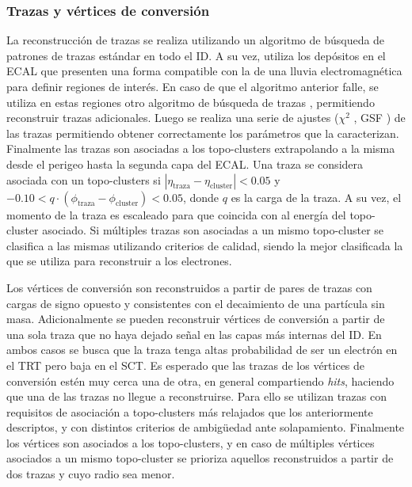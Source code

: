 
\subsubsection{Trazas y vértices de conversión}

La reconstrucción de trazas se realiza utilizando un algoritmo de búsqueda de patrones de trazas estándar
\cite{Cornelissen:1020106, PERF-2017-02, PERF-2017-01} en todo el ID. A su vez, utiliza los depósitos en el ECAL que presenten una forma compatible con la de una lluvia electromagnética para definir regiones de interés. En caso de que el algoritmo anterior falle, se utiliza en estas regiones otro algoritmo de búsqueda de trazas \cite{FRUHWIRTH1987444}, permitiendo reconstruir trazas adicionales. Luego se realiza una serie de ajustes ($\chi^2$ \cite{Cornelissen:1176901}, GSF \cite{ATLAS-CONF-2012-047}) de las trazas permitiendo obtener correctamente los parámetros que la caracterizan. Finalmente las trazas son asociadas a los topo-clusters extrapolando a la misma desde el perigeo hasta la segunda capa del ECAL. Una traza se considera asociada con un topo-clusters si $|\eta_{\text{traza}}-\eta_{\text{cluster}}|<0.05$ y $-0.10<q\cdot(\phi_{\text{traza}}-\phi_{\text{cluster}})<0.05$, donde $q$ es la carga de la traza. A su vez, el momento de la traza es escaleado para que coincida con al energía del topo-cluster asociado. Si múltiples trazas son asociadas a un mismo topo-cluster se clasifica a las mismas utilizando criterios de calidad, siendo la mejor clasificada la que se utiliza para reconstruir a los electrones. 

Los vértices de conversión son reconstruidos a partir de pares de trazas con cargas de signo opuesto y consistentes con el decaimiento de una partícula sin masa. Adicionalmente se pueden reconstruir vértices de conversión a partir de una sola traza que no haya dejado señal en las capas más internas del ID. En ambos casos se busca que la traza tenga altas probabilidad de ser un electrón en el TRT \cite{ATLAS-CONF-2011-128} pero baja en el SCT. Es esperado que las trazas de los vértices de conversión estén muy cerca una de otra, en general compartiendo \textit{hits}, haciendo que una de las trazas no llegue a reconstruirse. Para ello se utilizan trazas con requisitos de asociación a topo-clusters más relajados que los anteriormente descriptos, y con distintos criterios de ambigüedad ante solapamiento. Finalmente los vértices son asociados a los topo-clusters, y en caso de múltiples vértices asociados a un mismo topo-cluster se prioriza aquellos reconstruidos a partir de dos trazas y cuyo radio sea menor.

